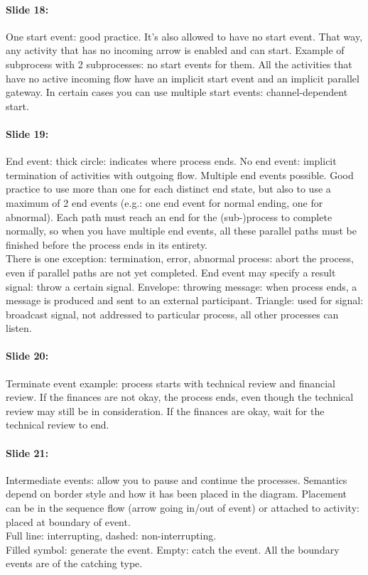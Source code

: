 \documentclass[10pt,a4paper]{report}
\begin{document}
\paragraph{Slide 18:}One start event: good practice. It's also allowed to have no start event. That way, any activity that has no incoming arrow is enabled and can start. Example of subprocess with 2 subprocesses: no start events for them. All the activities that have no active incoming flow have an implicit start event and an implicit parallel gateway. In certain cases you can use multiple start events: channel-dependent start.

\paragraph{Slide 19:}End event: thick circle: indicates where process ends. No end event: implicit termination of activities with outgoing flow. Multiple end events possible. Good practice to use more than one for each distinct end state, but also to use a maximum of 2 end events (e.g.: one end event for normal ending, one for abnormal). Each path must reach an end for the (sub-)process to complete normally, so when you have multiple end events, all these parallel paths must be finished before the process ends in its entirety.\\
There is one exception: termination, error, abnormal process: abort the process, even if parallel paths are not yet completed.
End event may specify a result signal: throw a certain signal. Envelope: throwing message: when process ends, a message is produced and sent to an external participant. Triangle: used for signal: broadcast signal, not addressed to particular process, all other processes can listen.

\paragraph{Slide 20:}Terminate event example: process starts with technical review and financial review. If the finances are not okay, the process ends, even though the technical review may still be in consideration. If the finances are okay, wait for the technical review to end.

\paragraph{Slide 21:}Intermediate events: allow you to pause and continue the processes. Semantics depend on border style and how it has been placed in the diagram. Placement can be in the sequence flow (arrow going in/out of event) or attached to activity: placed at boundary of event.\\
Full line: interrupting, dashed: non-interrupting.\\
Filled symbol: generate the event. Empty: catch the event. All the boundary events are of the catching type.
\end{document}
